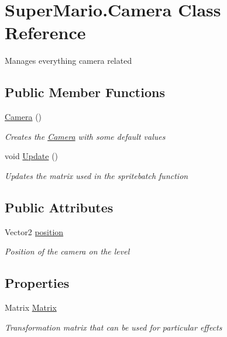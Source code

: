 \hypertarget{class_super_mario_1_1_camera}{}\section{Super\+Mario.\+Camera Class Reference}
\label{class_super_mario_1_1_camera}


Manages everything camera related  


\subsection*{Public Member Functions}
\begin{DoxyCompactItemize}
\item 
\mbox{\hyperlink{class_super_mario_1_1_camera_a5828416f8cef0538d1fe07bb31bf5f69}{Camera}} ()
\begin{DoxyCompactList}\small\item\em Creates the \mbox{\hyperlink{class_super_mario_1_1_camera}{Camera}} with some default values \end{DoxyCompactList}\item 
void \mbox{\hyperlink{class_super_mario_1_1_camera_a0fb046d2afebef6dd9a6507505909ec3}{Update}} ()
\begin{DoxyCompactList}\small\item\em Updates the matrix used in the spritebatch function \end{DoxyCompactList}\end{DoxyCompactItemize}
\subsection*{Public Attributes}
\begin{DoxyCompactItemize}
\item 
Vector2 \mbox{\hyperlink{class_super_mario_1_1_camera_a7dad8a59e38607abdc8fc8110e91d8d5}{position}}
\begin{DoxyCompactList}\small\item\em Position of the camera on the level \end{DoxyCompactList}\end{DoxyCompactItemize}
\subsection*{Properties}
\begin{DoxyCompactItemize}
\item 
Matrix \mbox{\hyperlink{class_super_mario_1_1_camera_aa1e50a0b539ec3092518b2c37984bb05}{Matrix}}
\begin{DoxyCompactList}\small\item\em Transformation matrix that can be used for particular effects \end{DoxyCompactList}\end{DoxyCompactItemize}


